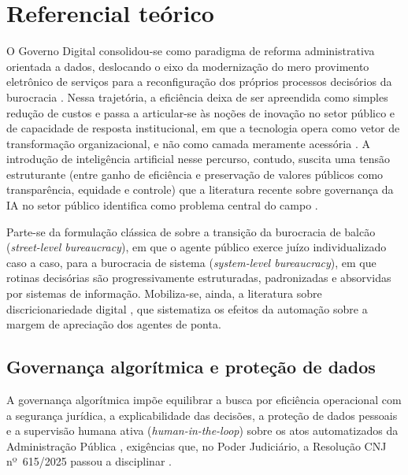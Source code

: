 
\section{Referencial teórico}

O Governo Digital consolidou-se como paradigma de reforma administrativa
orientada a dados, deslocando o eixo da modernização do mero provimento
eletrônico de serviços para a reconfiguração dos próprios processos decisórios
da burocracia \parencite{diniz2009,bovens2002}. Nessa trajetória, a eficiência
deixa de ser apreendida como simples redução de custos e passa a articular-se
às noções de inovação no setor público e de capacidade de resposta
institucional, em que a tecnologia opera como vetor de transformação
organizacional, e não como camada meramente acessória \parencite{freire2023}.
A introdução de inteligência artificial nesse percurso, contudo, suscita uma
tensão estruturante (entre ganho de eficiência e preservação de valores
públicos como transparência, equidade e controle) que a literatura recente
sobre governança da IA no setor público identifica como problema central do
campo \parencite{filgueiras2022}.

Parte-se da formulação clássica de  sobre a transição
da burocracia de balcão (\textit{street-level bureaucracy}), em que o agente
público exerce juízo individualizado caso a caso, para a burocracia de sistema
(\textit{system-level bureaucracy}), em que rotinas decisórias são
progressivamente estruturadas, padronizadas e absorvidas por sistemas de
informação. Mobiliza-se, ainda, a literatura sobre discricionariedade digital
\parencite{busch2018}, que sistematiza os efeitos da automação sobre a margem
de apreciação dos agentes de ponta.

\subsection{Governança algorítmica e proteção de dados}

A governança algorítmica impõe equilibrar a busca por eficiência operacional
com a segurança jurídica, a explicabilidade das decisões, a proteção de dados
pessoais e a supervisão humana ativa (\textit{human-in-the-loop}) sobre os atos
automatizados da Administração Pública \parencite{filgueiras2022}, exigências
que, no Poder Judiciário, a Resolução CNJ nº~615/2025 passou a disciplinar
\parencite{tamer2025}.

